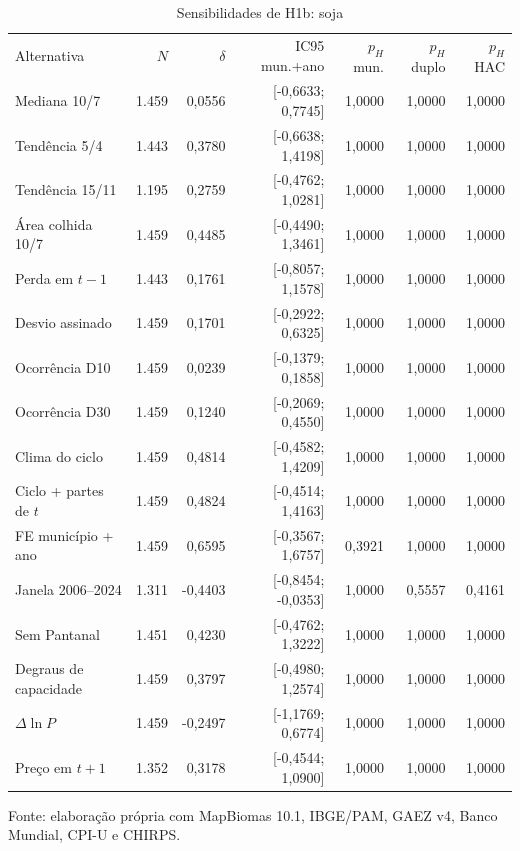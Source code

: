 \begin{table}[htbp]
\centering
\footnotesize
\setlength{\tabcolsep}{3pt}
\renewcommand{\arraystretch}{1.1}
\normalcaption\captionstyle{\centering}
\caption{Sensibilidades de H1b: soja}
\label{tab:h1-sens-soja}
\begin{tabular}{lrrrrrr}
\hline
Alternativa & $N$ & $\delta$ & IC95 mun.+ano & $p_H$ mun. & $p_H$ duplo & $p_H$ HAC \\
Mediana 10/7 & 1.459 & 0,0556 & [-0,6633; 0,7745] & 1,0000 & 1,0000 & 1,0000 \\
Tendência 5/4 & 1.443 & 0,3780 & [-0,6638; 1,4198] & 1,0000 & 1,0000 & 1,0000 \\
Tendência 15/11 & 1.195 & 0,2759 & [-0,4762; 1,0281] & 1,0000 & 1,0000 & 1,0000 \\
Área colhida 10/7 & 1.459 & 0,4485 & [-0,4490; 1,3461] & 1,0000 & 1,0000 & 1,0000 \\
Perda em $t-1$ & 1.443 & 0,1761 & [-0,8057; 1,1578] & 1,0000 & 1,0000 & 1,0000 \\
Desvio assinado & 1.459 & 0,1701 & [-0,2922; 0,6325] & 1,0000 & 1,0000 & 1,0000 \\
Ocorrência D10 & 1.459 & 0,0239 & [-0,1379; 0,1858] & 1,0000 & 1,0000 & 1,0000 \\
Ocorrência D30 & 1.459 & 0,1240 & [-0,2069; 0,4550] & 1,0000 & 1,0000 & 1,0000 \\
Clima do ciclo & 1.459 & 0,4814 & [-0,4582; 1,4209] & 1,0000 & 1,0000 & 1,0000 \\
Ciclo + partes de $t$ & 1.459 & 0,4824 & [-0,4514; 1,4163] & 1,0000 & 1,0000 & 1,0000 \\
FE município + ano & 1.459 & 0,6595 & [-0,3567; 1,6757] & 0,3921 & 1,0000 & 1,0000 \\
Janela 2006--2024 & 1.311 & -0,4403 & [-0,8454; -0,0353] & 1,0000 & 0,5557 & 0,4161 \\
Sem Pantanal & 1.451 & 0,4230 & [-0,4762; 1,3222] & 1,0000 & 1,0000 & 1,0000 \\
Degraus de capacidade & 1.459 & 0,3797 & [-0,4980; 1,2574] & 1,0000 & 1,0000 & 1,0000 \\
$\Delta\ln P$ & 1.459 & -0,2497 & [-1,1769; 0,6774] & 1,0000 & 1,0000 & 1,0000 \\
Preço em $t+1$ & 1.352 & 0,3178 & [-0,4544; 1,0900] & 1,0000 & 1,0000 & 1,0000 \\
\hline\end{tabular}
\par\smallskip
\begin{minipage}{\textwidth}\footnotesize\centering
Fonte: elaboração própria com MapBiomas 10.1, IBGE/PAM, GAEZ v4, Banco Mundial, CPI-U e CHIRPS.
\end{minipage}
\end{table}
